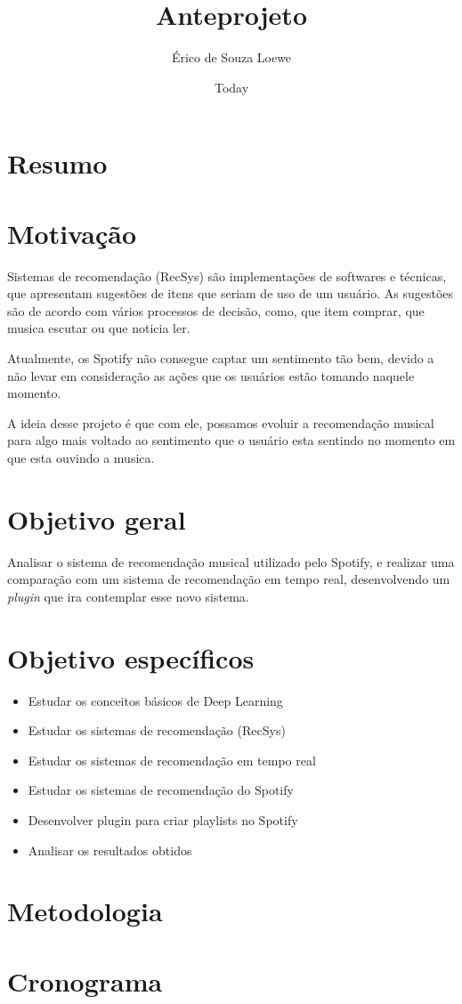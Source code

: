 \documentclass{article}
\title{Anteprojeto}
\author{Érico de Souza Loewe}
\date{Today}
\begin{document}
\maketitle

\section{Resumo}

\section{Motivação}

Sistemas de recomendação (RecSys) são implementações de softwares e técnicas, que apresentam sugestões de itens que seriam de uso de um usuário. As sugestões são de acordo com vários processos de decisão, como, que item comprar, que musica escutar ou que noticia ler. \cite{ricci2011introduction}

Atualmente, os Spotify não consegue captar um sentimento tão bem, devido a não levar em consideração as ações que os usuários estão tomando naquele momento. 

A ideia desse projeto é que com ele, possamos evoluir a recomendação musical para algo mais voltado ao sentimento que o usuário esta sentindo no momento em que esta ouvindo a musica.

\section{Objetivo geral}

Analisar o sistema de recomendação musical utilizado pelo Spotify, e realizar uma comparação com um sistema de recomendação em tempo real, desenvolvendo um \textit{plugin} que ira contemplar esse novo sistema.

\section{Objetivo específicos}

\begin{itemize}
\item Estudar os conceitos básicos de Deep Learning
\item Estudar os sistemas de recomendação (RecSys)
\item Estudar os sistemas de recomendação em tempo real
\item Estudar os sistemas de recomendação do Spotify
\item Desenvolver plugin para criar playlists no Spotify
\item Analisar os resultados obtidos
\end{itemize}

\section{Metodologia}

\section{Cronograma}



\end{document}

